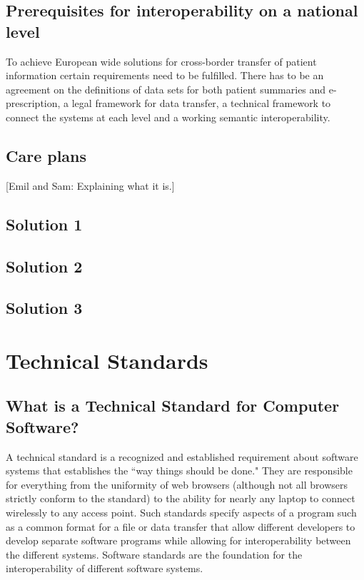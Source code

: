 \documentclass[14pt]{article}
\begin{document}
\subsection{Prerequisites for interoperability on a national level}

To achieve European wide solutions for cross-border transfer of patient information certain requirements need to be fulfilled. There has to be an agreement on the definitions of data sets for both patient summaries and e-prescription, a legal framework for data transfer, a technical framework to connect the systems at each level and a working semantic \gls{interoperability}. \cite{epSOS1}

\subsection{Care plans}
[Emil and Sam: Explaining what it is.]

\subsection{Solution 1}
\subsection{Solution 2}
\subsection{Solution 3}

\newpage

\section{Technical Standards}
\label{sec:TechnicalStandards}

\subsection{What is a Technical Standard for Computer Software?}
A technical standard is a recognized and established requirement about software systems that establishes the ``way things should be done." They are responsible for everything from the uniformity of web browsers (although not all browsers strictly conform to the standard) to the ability for nearly any laptop to connect wirelessly to any access point. Such standards specify aspects of a program such as a common format for a file or data transfer that allow different developers to develop separate software programs while allowing for \gls{interoperability} between the different systems. Software standards are the foundation for the \gls{interoperability} of different software systems.
\end{document}
